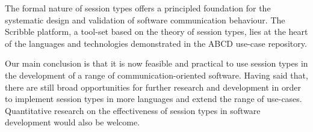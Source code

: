 
The formal %
nature of session types
offers a principled foundation for the systematic design and validation of software communication behaviour. 
The Scribble platform, a tool-set based on the
theory of session types, lies at the heart of the languages and technologies demonstrated in the ABCD use-case repository.

Our main conclusion is that it is now feasible and practical to use session types in the development of a range of communication-oriented software. Having said that, there are still broad opportunities for further research and development in order to implement session types in more languages and extend the range of use-cases. Quantitative research on the effectiveness of session types in software development would also be welcome.
 
